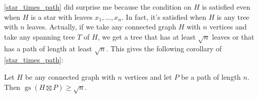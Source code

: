 \documentclass{patmorin}
\newcommand{\defin}[1]{\textcolor{Maroon}{\emph{#1}}}
\DeclareMathOperator{\tw}{tw}
\DeclareMathOperator{\gm}{gm}
\DeclareMathOperator{\gs}{gs}
\begin{document}
\cref{star_times_path} did surprise me  because the condition on $H$ is satisfied even when $H$ is a star with leaves $x_1,\ldots,x_n$.  In fact, it's satisfied when $H$ is any tree with $n$ leaves.  Actually, if we take any connected graph $H$ with $n$ vertices and take any spanning tree $T$ of $H$, we get a tree that has at least $\sqrt{n}$ leaves or that has a path of length at least $\sqrt{n}$.  This gives the following corollary of \cref{star_times_path}:

\begin{cor}\label{graph_times_path}
  Let $H$ be any connected graph with $n$ vertices and let $P$ be a path of length $n$.  Then $\gs(H\boxtimes P)\ge \sqrt{n}$.
\end{cor}

%
%
%
\end{document}
